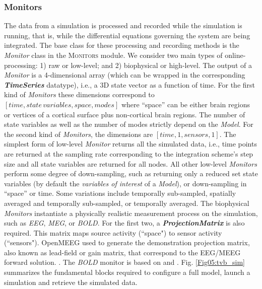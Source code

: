 \documentclass{bioinfo}
\newcommand*{\tvbmodule}[1]{{\textsc{#1}}}          %
\newcommand*{\tvbdatatype}[1]{\textbf{\emph{#1}}}   %
\newcommand*{\tvbclass}[1]{{\ttfamily\emph{#1}}}    %
\begin{document}
\begin{methods}
    \subsubsection{Monitors}
    The data from a simulation is processed and recorded while the simulation
    is running, that is, while the differential equations governing the system
    are being integrated. The base class for these processing and recording
    methods is the \tvbclass{Monitor} class in the \tvbmodule{Monitors}
    module.  We consider two main types of  online-processing: 1) raw or 
    low-level; and 2) biophysical or high-level. The output of a
    \tvbclass{Monitor} is a 4-dimensional  array (which can be wrapped in the
    corresponding \tvbdatatype{TimeSeries}  datatype), i.e., a 3D state vector
    as a function of time. For the first  kind of \tvbclass{Monitors} these
    dimensions correspond to  $[time, state\,variables, space, modes]$ where
    ``space'' can be either  brain regions or vertices of a cortical surface
    plus non-cortical brain  regions. The number of state variables as well as
    the number of modes strictly depend on the \tvbclass{Model}. For the
    second kind of  \tvbclass{Monitors}, the dimensions are $[time, 1,
    sensors, 1]$. The  simplest form of low-level \tvbclass{Monitor} returns
    all the simulated  data, i.e., time points are returned at the sampling
    rate corresponding to the integration scheme's step size and all 
    state variables are returned for all nodes. All other low-level
    \tvbclass{Monitors} perform some degree of down-sampling, such as
    returning only a reduced set state variables (by  default the
    \emph{variables of interest} of a \tvbclass{Model}), or  down-sampling in
    ``space'' or time. Some variations include temporally sub-sampled,
    spatially averaged and temporally sub-sampled, or temporally averaged. The
    biophysical \tvbclass{Monitors} instantiate a physically realistic
    measurement process on the simulation, such as \tvbclass{EEG},
    \tvbclass{MEG}, \add{\tvbclass{SEEG}} or \tvbclass{BOLD}. For the first
    two, a \tvbdatatype{ProjectionMatrix} is also required. This matrix  maps
    source activity (``space")  to sensor activity (``sensors").
     OpenMEEG \citep{Gramfort_2010}  used
    to generate the demonstration projection matrix, also known as 
    lead-field or gain matrix, that correspond to the EEG/MEEG forward solution.
     \citep{Sarvas_1987}.
    The \tvbclass{BOLD} monitor is based on \citet{Buxton_1997} and \citet{Friston_2000}.
    Fig. \ref{Fig05:tvb_sim} summarizes the fundamental blocks  required to
    configure a full model, launch a simulation and retrieve the simulated
    data. 


\end{methods}
\end{document}
